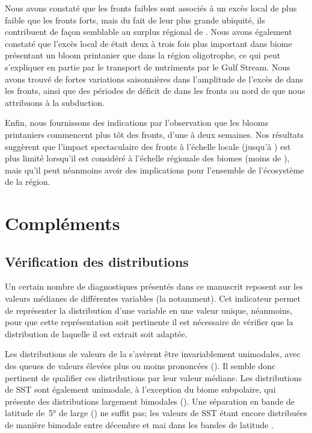 Nous avons constaté que les fronts faibles sont associés à un excès local de  plus faible que les fronts forts, mais du fait de leur plus grande ubiquité, ils contribuent de façon semblable au surplus régional de .
Nous avons également constaté que l'excès local de  était deux à trois fois plus important dans biome présentant un bloom printanier que dans la région oligotrophe, ce qui peut s'expliquer en partie par le transport de nutriments par le Gulf Stream.
Nous avons trouvé de fortes variations saisonnières dans l'amplitude de l'excès de  dans les fronts, ainsi que des périodes de déficit de  dans les fronts au nord de  que nous attribuons à la subduction.

Enfin, nous fournissons des indications par l'observation que les blooms printaniers commencent plus tôt des fronts, d'une à deux semaines.
Nos résultats suggèrent que l'impact spectaculaire des fronts à l'échelle locale (jusqu'à ) est plus limité lorsqu'il est considéré à l'échelle régionale des biomes (moins de ), mais qu'il peut néanmoins avoir des implications pour l'ensemble de l'écosystème de la région.

\insertArticle{}

\section{Compléments}
\label{sec:complements-chl}
\suppressfloats[t]

\subsection{Vérification des distributions}
\label{sec:verif-hist}

Un certain nombre de diagnostiques présentés dans ce manuscrit reposent sur les valeurs médianes de différentes variables (la  notamment).
Cet indicateur permet de représenter la distribution d'une variable en une valeur unique, néanmoins, pour que cette représentation soit pertinente il est nécessaire de vérifier que la distribution de laquelle il est extrait soit adaptée.

Les distributions de valeurs de la  s'avèrent être invariablement unimodales, avec des queues de valeurs élevées plus ou moins prononcées ().
Il semble donc pertinent de qualifier ces distributions par leur valeur médiane.
Les distributions de SST sont également unimodale, à l'exception du biome subpolaire, qui présente des distributions largement bimodales ().
Une séparation en bande de latitude de~\ang{5} de large () ne suffit pas; les valeurs de SST étant encore distribuées de manière bimodale entre décembre et mai dans les bandes de latitude .

